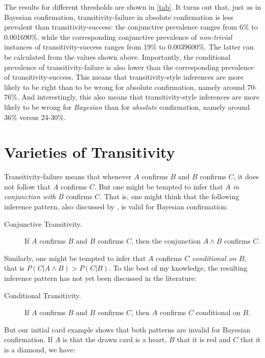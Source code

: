 \documentclass[a4paper,11pt]{article}
\begin{document}
The results for different thresholds are shown in \autoref{tab}. It turns out that, just as in Bayesian confirmation, transitivity-failure in absolute confirmation is less prevalent than transitivity-success: the conjunctive prevalence ranges from 6\% to 0.001690\%, while the corresponding conjunctive prevalence of \emph{non-trivial} instances of transitivity-success ranges from 19\% to 0.0039600\%. The latter can be calculated from the values shown above. Importantly, the conditional prevalence of transitivity-failure is also lower than the corresponding prevalence of transitivity-success. This means that transitivity-style inferences are more likely to be right than to be wrong for absolute confirmation, namely around 70-76\%. And interestingly, this also means that transitivity-style inferences are more likely to be wrong for \emph{Bayesian} than for \emph{absolute} confirmation, namely around 36\% versus 24-30\%. 


\section{Varieties of Transitivity}
\label{sec5}

Transitivity-failure means that whenever $A$ confirms $B$ and $B$ confirms $C$, it does not follow that $A$ confirms $C$. But one might be tempted to infer that $A$ \emph{in conjunction with} $B$ confirms $C$. That is, one might think that the following inference pattern, also discussed by \cite{Douven2011}, is valid for Bayesian confirmation:

\begin{description}
\item[Conjunctive Transitivity.] If $A$ confirms $B$ and $B$ confirms $C$, then the conjunction $A\land B$ confirms $C$.
\end{description}

\noindent Similarly, one might be tempted to infer that $A$ confirms $C$ \emph{conditional on} $B$, that is $P(C|A\land B)>P(C|B)$. To the best of my knowledge, the resulting inference pattern has not yet been discussed in the literature: 
\begin{description}
\item[Conditional Transitivity.] If $A$ confirms $B$ and $B$ confirms $C$, then $A$ confirms $C$ conditional on $B$.
\end{description}

\noindent But our initial card example shows that both patterns are invalid for Bayesian confirmation. If $A$ is that the drawn card is a heart, $B$ that it is red and $C$ that it is a diamond, we have: 
\end{document}
